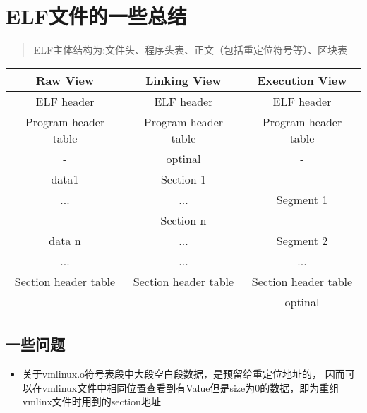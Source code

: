 \section{ELF文件的一些总结}
  \begin{quote}
    ELF主体结构为:文件头、程序头表、正文（包括重定位符号等）、区块表\cite{Yale}
  \end{quote}
\begin{table}[h!]
  \centering
  \begin{tabular}{c|c|c}
    \hline
    Raw View & Linking View & Execution View \\
    \hline
    ELF header & ELF header & ELF header \\
    Program header table  &Program header table & Program header table \\
    - &optinal &  -\\
    data1  & Section 1 & \\
    ...  &...&Segment 1\\
     & Section n & \\
    data n  &...&Segment 2\\
    ...&...&...\\
    Section header table  &Section header table & Section header table \\
    -  &  - & optinal \\
    \hline
  \end{tabular}
\end{table}
\subsection{一些问题}
  \begin{itemize}
    \item 关于vmlinux.o符号表段中大段空白段数据，是预留给重定位地址的，
    因而可以在vmlinux文件中相同位置查看到有Value但是size为0的数据，即为重组vmlinx文件时用到的section地址 
  \end{itemize}
  
